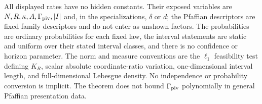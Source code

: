 \begin{theorem}
All displayed rates have no hidden constants.  Their exposed variables are
$N,R,\kappa,A,\Gamma_{\rm piv},|I|$ and, in the specializations,
$\delta$ or $d$; the Pfaffian descriptors are fixed family descriptors and
do not enter as unshown factors.  The probabilities are ordinary
probabilities for each fixed law, the interval statements are static and
uniform over their stated interval classes, and there is no confidence or
horizon parameter.  The norm and measure conventions are the $\ell_1$
feasibility test defining $K_R$, scalar absolute coordinate-ratio variation,
one-dimensional interval length, and full-dimensional Lebesgue density.
No independence or probability conversion is implicit.  The theorem does
not bound $\Gamma_{\rm piv}$ polynomially in general Pfaffian presentation
data.
\end{theorem}
